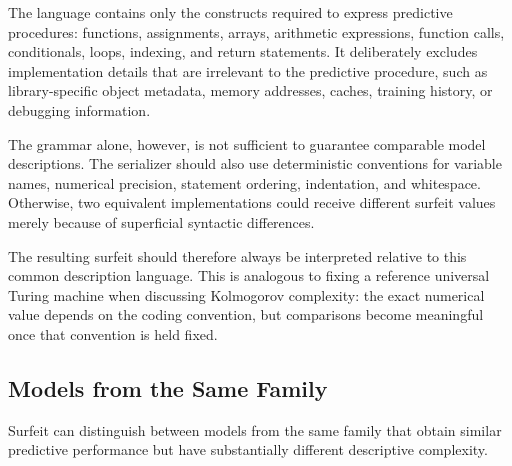 The language contains only the constructs required to express predictive procedures: functions, assignments, arrays, arithmetic expressions, function calls, conditionals, loops, indexing, and return statements. It deliberately excludes implementation details that are irrelevant to the predictive procedure, such as library-specific object metadata, memory addresses, caches, training history, or debugging information.

The grammar alone, however, is not sufficient to guarantee comparable model descriptions. The serializer should also use deterministic conventions for variable names, numerical precision, statement ordering, indentation, and whitespace. Otherwise, two equivalent implementations could receive different surfeit values merely because of superficial syntactic differences.

The resulting surfeit should therefore always be interpreted relative to this common description language. This is analogous to fixing a reference universal Turing machine when discussing Kolmogorov complexity: the exact numerical value depends on the coding convention, but comparisons become meaningful once that convention is held fixed.

\subsection*{Models from the Same Family}

Surfeit can distinguish between models from the same family that obtain similar predictive performance but have substantially different descriptive complexity.

